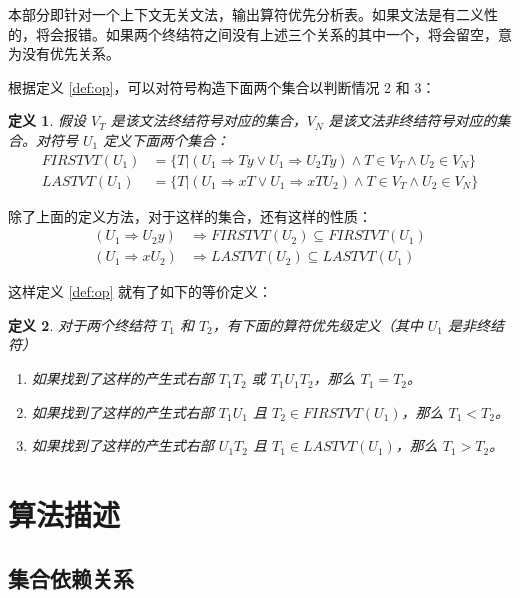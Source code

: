 \documentclass[UTF8]{ctexart}
\newtheorem{definition}{定义}
\begin{document}
本部分即针对一个上下文无关文法，输出算符优先分析表。如果文法是有二义性的，将会报错。如果两个终结符之间没有上述三个关系的其中一个，将会留空，意为没有优先关系。

根据定义 \ref{def:op}，可以对符号构造下面两个集合以判断情况 2 和 3：

\begin{definition}\label{def:vt}
    假设 $V_T$ 是该文法终结符号对应的集合，$V_N$ 是该文法非终结符号对应的集合。对符号 $U_1$ 定义下面两个集合：
    \begin{align}
        \textit{FIRSTVT}(U_1) &= \{T|(U_1\Rightarrow Ty \vee U_1\Rightarrow U_2Ty)\land T\in V_T\land U_2\in V_N\} \label{eq:mono1} \\
        \textit{LASTVT}(U_1) &= \{T|(U_1\Rightarrow xT \vee U_1\Rightarrow xTU_2)\land T\in V_T\land U_2\in V_N\} \label{eq:mono2}
    \end{align}
\end{definition}

除了上面的定义方法，对于这样的集合，还有这样的性质：
\begin{align}
    (U_1\Rightarrow U_2y) &\Rightarrow \textit{FIRSTVT}(U_2)\subseteq \textit{FIRSTVT}(U_1) \label{eq:con1} \\
    (U_1\Rightarrow xU_2) &\Rightarrow \textit{LASTVT}(U_2)\subseteq \textit{LASTVT}(U_1) \label{eq:con2}
\end{align}

这样定义 \ref{def:op} 就有了如下的等价定义：
\begin{definition}\label{def:opn}
    对于两个终结符 $T_1$ 和 $T_2$，有下面的算符优先级定义（其中 $U_1$ 是非终结符）
    \begin{enumerate}
        \item 如果找到了这样的产生式右部 $T_1T_2$ 或 $T_1U_1T_2$，那么 $T_1=T_2$。
        \item 如果找到了这样的产生式右部 $T_1U_1$ 且 $T_2\in\textit{FIRSTVT}(U_1)$，那么 $T_1<T_2$。
        \item 如果找到了这样的产生式右部 $U_1T_2$ 且 $T_1\in\textit{LASTVT}(U_1)$，那么 $T_1>T_2$。
    \end{enumerate}
\end{definition}

\section{算法描述}

\subsection{集合依赖关系}
\end{document}
